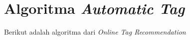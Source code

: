 





\section{Algoritma \emph{Automatic Tag}}

Berikut adalah algoritma dari \textit{Online Tag Recommendation}

